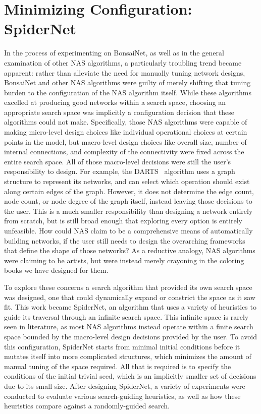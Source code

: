 \section{Minimizing Configuration: SpiderNet}
In the process of experimenting on BonsaiNet, as well as in the general examination of other NAS algorithms,
a particularly troubling trend became apparent: rather than alleviate the need for manually tuning network designs, BonsaiNet and other NAS algorithms were
guilty of merely shifting that tuning burden to the configuration of the NAS algorithm itself. While these algorithms excelled
at producing good networks within a search space, choosing an appropriate search space
was implicitly a configuration decision that these algorithms could not make. Specifically, those NAS algorithms were capable
of making micro-level design choices like individual operational choices at certain points in the model, but macro-level
design choices like overall size, number of internal connections, and complexity of the connectivity were fixed across the
entire search space. All of those macro-level decisions were still the user's responsibility to design.
For example, the DARTS~\citep{liu2018} algorithm uses a graph structure to represent its networks,
and can select which operation should exist along certain edges of the graph. However, it does not determine
the edge count, node count, or node degree of the graph itself, instead leaving those decisions to the user.
This is a much smaller responsibility than designing a network entirely from scratch,
but is still broad enough that exploring every option is entirely unfeasible. How could NAS claim to be a comprehensive
means of automatically building networks, if the user still needs to design the overarching frameworks that define the shape
of those networks? As a reductive analogy, NAS algorithms were claiming to be artists, but were instead merely crayoning
in the coloring books we have designed for them.

To explore these concerns a search algorithm that provided its own
search space was designed, one that could dynamically expand or constrict the space as it saw fit. This work became SpiderNet, an algorithm
that uses a variety of heuristics to guide its traversal through an infinite search space. This infinite space is rarely
seen in literature, as most NAS algorithms instead operate within a finite search space bounded by the macro-level
design decisions provided by the user. To avoid this configuration, SpiderNet starts from minimal
initial conditions before it mutates itself into more complicated structures, which minimizes the amount of manual
tuning of the space required. All that is required is to specify the conditions of the initial trivial seed, which is an implicitly
smaller set of decisions due to its small size. After designing SpiderNet, a variety of experiments were conducted to evaluate
various search-guiding heuristics, as well as how these heuristics compare against a randomly-guided search.

